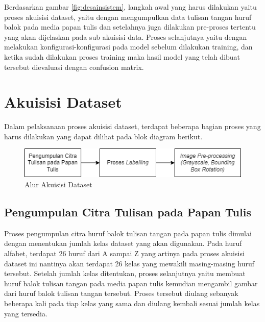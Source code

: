 Berdasarkan gambar \ref*{fig:desainsistem}, langkah awal yang harus dilakukan yaitu proses akuisisi dataset, yaitu dengan mengumpulkan data tulisan tangan huruf balok pada media papan tulis dan setelahnya juga dilakukan pre-proses tertentu yang akan dijelaskan pada sub akuisisi data. Proses selanjutnya yaitu dengan melakukan konfigurasi-konfigurasi pada model sebelum dilakukan training, dan ketika sudah dilakukan proses training maka hasil model yang telah dibuat tersebut dievaluasi dengan confusion matrix. \par


\section{Akuisisi Dataset}
\label{sec:akuisisidataset}

Dalam pelaksanaan proses akuisisi dataset, terdapat beberapa bagian proses yang harus dilakukan yang dapat dilihat pada blok diagram berikut.

\begin{figure}[ht]
    \centering
    \includegraphics[scale=0.85]{gambar/metodologi_akuisisi_data.png}
    \caption{Alur Akuisisi Dataset}
    \label{fig:alurakuisisidataset}
\end{figure}

\subsection{Pengumpulan Citra Tulisan pada Papan Tulis}
\label{subsec:pengumpulancitra}

Proses pengumpulan citra huruf balok tulisan tangan pada papan tulis dimulai dengan menentukan jumlah kelas dataset yang akan digunakan. Pada huruf alfabet, terdapat 26 huruf dari A sampai Z yang artinya pada proses akuisisi dataset ini nantinya akan terdapat 26 kelas yang mewakili masing-masing huruf tersebut. Setelah jumlah kelas ditentukan, proses selanjutnya yaitu membuat huruf balok tulisan tangan pada media papan tulis kemudian mengambil gambar dari huruf balok tulisan tangan tersebut. Proses tersebut diulang sebanyak beberapa kali pada tiap kelas yang sama dan diulang kembali sesuai jumlah kelas yang tersedia. \par


